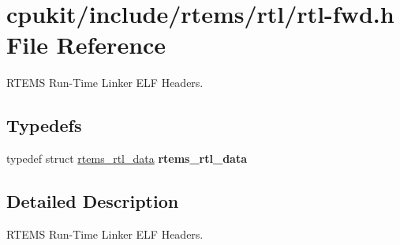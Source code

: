 \hypertarget{rtl-fwd_8h}{}\section{cpukit/include/rtems/rtl/rtl-\/fwd.h File Reference}
\label{rtl-fwd_8h}


R\+T\+E\+MS Run-\/\+Time Linker E\+LF Headers.  


\subsection*{Typedefs}
\begin{DoxyCompactItemize}
\item 
\mbox{\label{rtl-fwd_8h_ab956ec40ae4a32be8cb3551aadccc119}} 
typedef struct \mbox{\hyperlink{structrtems__rtl__data}{rtems\+\_\+rtl\+\_\+data}} {\bfseries rtems\+\_\+rtl\+\_\+data}
\end{DoxyCompactItemize}


\subsection{Detailed Description}
R\+T\+E\+MS Run-\/\+Time Linker E\+LF Headers. 

